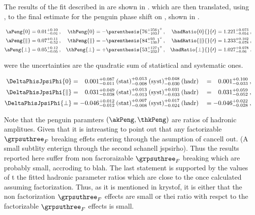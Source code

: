 The results of the \chisq fit described in  are shown in .
which are then translated, using , to the final estimate for the penguin phase shift on \phis,
shown in .

\begin{subequations}
\label{peng_a_theta_results}
\begin{align}
    \aPeng{0}         & = 0.01^{+0.10}_{-0.01}\:, & \thPeng{0}         & = -\parenthesis{76^{+256}_{-103}}^\circ\:, & \hadRatio{0}{}{\prime}         = 1.221^{+0.073}_{-0.054}\:,\\
    \aPeng{\parallel} & = 0.07^{+0.11}_{-0.52}\:, & \thPeng{\parallel} & = -\parenthesis{84^{+93}_{-130}}^\circ\:,  & \hadRatio{\parallel}{}{\prime} = 1.233^{+0.102}_{-0.078}\:,\\
    \aPeng{\perp}     & = 0.05^{+0.12}_{-0.05}\:, & \thPeng{\perp}     & = +\parenthesis{53^{+127}_{-232}}^\circ\:, & \hadRatio{\perp}{}{\prime}     = 1.027^{+0.078}_{-0.06}\:.
\end{align}
\end{subequations}

\noindent were the uncertainties are the quadratic sum of statistical and systematic ones.

\begin{alignat}{2}
\DeltaPhisJpsiPhi{0} & =
\phantom{-}0.001^{+0.087}_{-0.011}\:\text{(stat)}^{+0.013}_{-0.008}\:\text{(syst)}^{+0.048}_{-0.030}\:(\text{hadr})
&& = \phantom{-}0.001^{+0.100}_{-0.033}\:,\\
%
\DeltaPhisJpsiPhi{\parallel} & =
\phantom{-}0.031^{+0.049}_{-0.038}\:\text{(stat)}^{+0.013}_{-0.013}\:\text{(syst)}^{+0.031}_{-0.033}\:(\text{hadr})
&& = \phantom{-}0.031^{+0.059}_{-0.052}\:,\\
%
\DeltaPhisJpsiPhi{\perp} & =
-0.046^{+0.012}_{-0.012}\:\text{(stat)}^{+0.007}_{-0.008}\:\text{(syst)}^{+0.017}_{-0.024}\:(\text{hadr})
&& = -0.046^{+0.022}_{-0.028}\:,
\label{delta_phis_result}
\end{alignat}

Note that the penguin paramters $(\akPeng,\thkPeng)$ are ratios of hadronic amplitues. Given that it is
intreasting to point out that any factorizable $\grpsuthree_F$ breaking effets entering through the asumption
of \equref{} cancell out. (A small subtlity enterign through the second schanell jspsirho).
Thus the results reported here suffer from non facroraizable $\grpsuthree_F$ breaking which are probably
small, accroding to blah. The last statement is supported by the values of t the fitted hadronic parameter
ratios which are close to the once calculated assuming factorization. Thus, as it is mentioned in krystof,
it is either that the non factorization $\grpsuthree_F$ effects are small or thei ratio with respct to
the factorizable $\grpsuthree_F$ effects is small.

